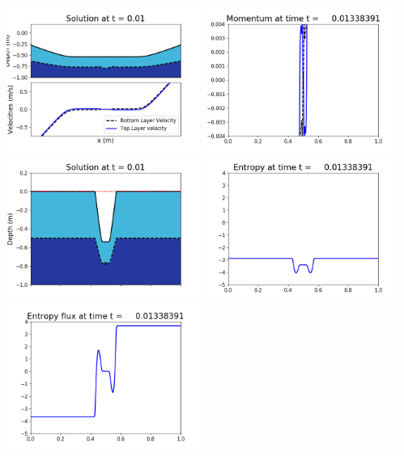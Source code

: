 \documentclass[11pt]{article}
\begin{document}
\includegraphics[width=0.475\textwidth]{frame0039fig1002.png}
\vskip 10pt 
\includegraphics[width=0.475\textwidth]{frame0039fig1003.png}
\includegraphics[width=0.475\textwidth]{frame0039fig1006.png}
\vskip 10pt 
\includegraphics[width=0.475\textwidth]{frame0039fig1007.png}
\includegraphics[width=0.475\textwidth]{frame0039fig1008.png}
\end{document}
